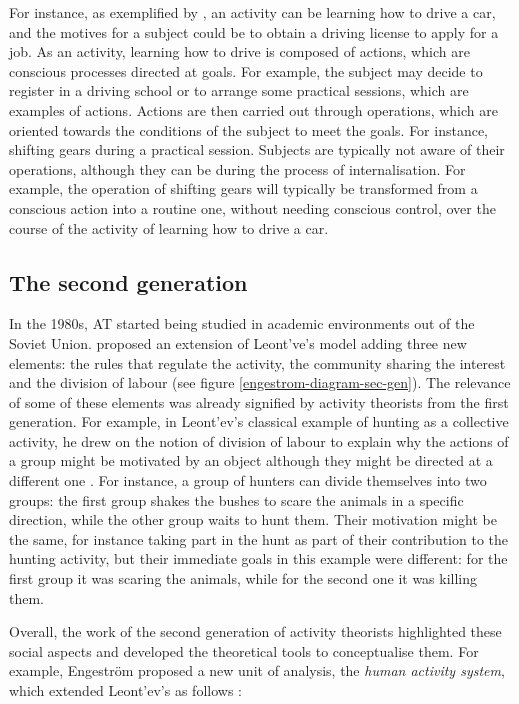 For instance, as exemplified by \textcite{kaptelinin2012}, an activity can be learning how to drive a car, and the motives for a subject could be to obtain a driving license to apply for a job. As an activity, learning how to drive is composed of actions, which are conscious processes directed at goals. For example, the subject may decide to register in a driving school or to arrange some practical sessions, which are examples of actions. Actions are then carried out through operations, which are oriented towards the conditions of the subject to meet the goals. For instance, shifting gears during a practical session. Subjects are typically not aware of their operations, although they can be during the process of internalisation. For example, the operation of shifting gears will typically be transformed from a conscious action into a routine one, without needing conscious control, over the course of the activity of learning how to drive a car.

\subsection{The second generation}
\label{subsec:2at}

In the 1980s, AT started being studied in academic environments out of the Soviet Union. \textcite{engestrom1987learning} proposed an extension of Leont've's model adding three new elements: the rules that regulate the activity, the community sharing the interest and the division of labour (see figure \ref{engestrom-diagram-sec-gen}). The relevance of some of these elements was already signified by activity theorists from the first generation. For example, in Leont'ev's classical example of hunting as a collective activity, he drew on the notion of division of labour to explain why the actions of a group might be motivated by an object although they might be directed at a different one \parencite{nardi2006activity}. For instance, a group of hunters can divide themselves into two groups: the first group shakes the bushes to scare the animals in a specific direction, while the other group waits to hunt them. Their motivation might be the same, for instance taking part in the hunt as part of their contribution to the hunting activity, but their immediate goals in this example were different: for the first group it was scaring the animals, while for the second one it was killing them.

Overall, the work of the second generation of activity theorists highlighted these social aspects and developed the theoretical tools to conceptualise them. For example, Engestr{\"o}m proposed a new unit of analysis, the \textit{human activity system}, which extended Leont'ev's as follows \parencite{Foot2001}:

